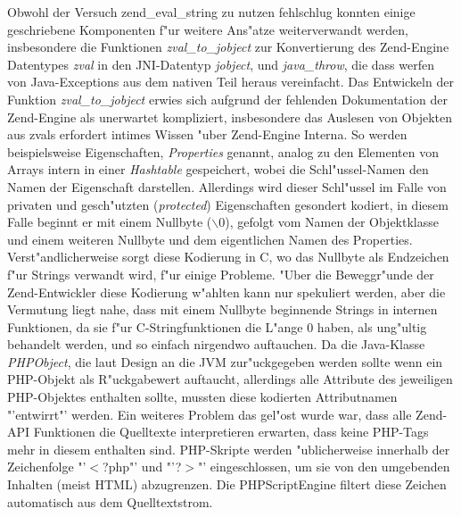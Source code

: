Obwohl der Versuch zend\_eval\_string zu nutzen fehlschlug konnten einige geschriebene Komponenten f"ur weitere
Ans"atze weiterverwandt werden, insbesondere die Funktionen \emph{zval\_to\_jobject} zur Konvertierung des Zend-Engine
Datentypes \emph{zval} in den JNI-Datentyp \emph{jobject}, und \emph{java\_throw}, die dass werfen von Java-Exceptions
aus dem nativen Teil heraus vereinfacht. 
Das Entwickeln der Funktion \emph{zval\_to\_jobject} erwies sich aufgrund der fehlenden Dokumentation der Zend-Engine als
unerwartet kompliziert, insbesondere das Auslesen von Objekten aus zvals erfordert intimes Wissen "uber Zend-Engine Interna.
So werden beispielsweise Eigenschaften, \emph{Properties} genannt, analog zu den Elementen von Arrays intern 
in einer \emph{Hashtable} gespeichert, wobei die Schl"ussel-Namen den Namen der Eigenschaft darstellen. Allerdings wird
dieser Schl"ussel im Falle von privaten und gesch"utzten (\emph{protected}) Eigenschaften gesondert kodiert, in diesem
Falle beginnt er mit einem Nullbyte ($\backslash$0), gefolgt vom Namen der Objektklasse und einem weiteren Nullbyte und dem eigentlichen
Namen des Properties. Verst"andlicherweise sorgt diese Kodierung in C, wo das Nullbyte als Endzeichen f"ur Strings verwandt wird,
f"ur einige Probleme. "Uber die Beweggr"unde der Zend-Entwickler diese Kodierung w"ahlten kann nur spekuliert werden, aber 
die Vermutung liegt nahe, dass mit einem Nullbyte beginnende Strings in internen Funktionen, da sie f"ur C-Stringfunktionen die L"ange 0 haben,
als ung"ultig behandelt werden, und so einfach nirgendwo auftauchen. Da die Java-Klasse \emph{PHPObject}, die laut Design an die JVM
zur"uckgegeben werden sollte wenn ein PHP-Objekt als R"uckgabewert auftaucht, allerdings alle
Attribute des jeweiligen PHP-Objektes enthalten sollte, mussten diese kodierten Attributnamen "'entwirrt"' werden.
Ein weiteres Problem das gel"ost wurde war, dass alle Zend-API Funktionen die
Quelltexte interpretieren erwarten, dass keine PHP-Tags mehr in diesem enthalten sind. PHP-Skripte werden "ublicherweise
innerhalb der Zeichenfolge "'$<$?php"' und "'?$>$"' eingeschlossen, um sie von den umgebenden Inhalten (meist HTML) abzugrenzen.
Die PHPScriptEngine filtert diese Zeichen automatisch aus dem Quelltextstrom.


